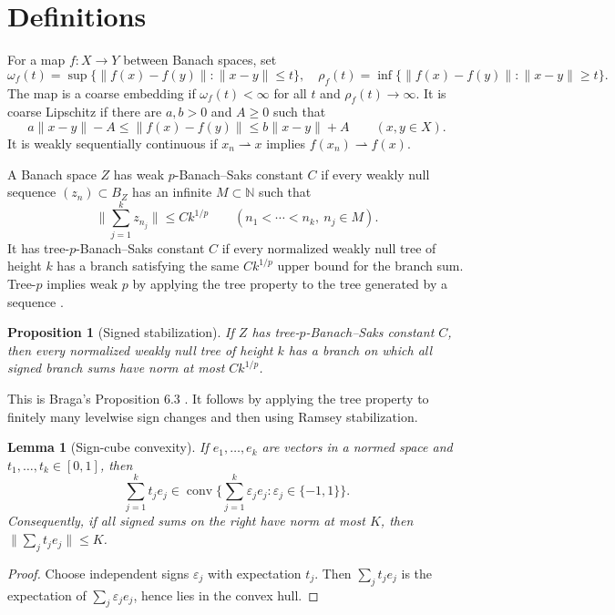 \documentclass[11pt]{article}
\newtheorem{proposition}{Proposition}
\newtheorem{lemma}{Lemma}
\newcommand{\N}{\mathbb N}
\newcommand{\eps}{\varepsilon}
\newcommand{\conv}{\operatorname{conv}}
\newcommand{\norm}[1]{\lVert #1\rVert}
\begin{document}
\section*{Definitions}

For a map \(f:X\to Y\) between Banach spaces, set
\[
 \omega_f(t)=\sup\{\norm{f(x)-f(y)}:\norm{x-y}\le t\},
 \quad
 \rho_f(t)=\inf\{\norm{f(x)-f(y)}:\norm{x-y}\ge t\}.
\]
The map is a coarse embedding if \(\omega_f(t)<\infty\) for all \(t\) and
\(\rho_f(t)\to\infty\).  It is coarse Lipschitz if there are \(a,b>0\) and
\(A\ge0\) such that
\begin{equation}\label{eq:affine-control}
 a\norm{x-y}-A\le\norm{f(x)-f(y)}\le b\norm{x-y}+A
 \qquad(x,y\in X).
\end{equation}
It is weakly sequentially continuous if \(x_n\rightharpoonup x\) implies
\(f(x_n)\rightharpoonup f(x)\).

A Banach space \(Z\) has weak \(p\)-Banach--Saks constant \(C\) if every
weakly null sequence \((z_n)\subset B_Z\) has an infinite \(M\subset\N\) such
that
\[
 \norm{\sum_{j=1}^k z_{n_j}}\le Ck^{1/p}
 \qquad(n_1<\cdots<n_k,\ n_j\in M).
\]
It has tree-\(p\)-Banach--Saks constant \(C\) if every normalized weakly null
tree of height \(k\) has a branch satisfying the same \(Ck^{1/p}\) upper
bound for the branch sum.  Tree-\(p\) implies weak \(p\) by applying the tree
property to the tree generated by a sequence \cite[Remark 6.4]{BragaJIMJ}.

\begin{proposition}[Signed stabilization]\label{prop:signed-tree}
If \(Z\) has tree-\(p\)-Banach--Saks constant \(C\), then every normalized
weakly null tree of height \(k\) has a branch on which all signed branch sums
have norm at most \(Ck^{1/p}\).
\end{proposition}

This is Braga's Proposition 6.3 \cite{BragaJIMJ}.  It follows by applying the
tree property to finitely many levelwise sign changes and then using Ramsey
stabilization.

\begin{lemma}[Sign-cube convexity]\label{lem:sign-cube}
If \(e_1,\ldots,e_k\) are vectors in a normed space and
\(t_1,\ldots,t_k\in[0,1]\), then
\[
 \sum_{j=1}^k t_j e_j\in
 \conv\{\sum_{j=1}^k\eps_j e_j:\eps_j\in\{-1,1\}\}.
\]
Consequently, if all signed sums on the right have norm at most \(K\), then
\(\norm{\sum_j t_j e_j}\le K\).
\end{lemma}

\begin{proof}
Choose independent signs \(\eps_j\) with expectation \(t_j\).  Then
\(\sum_j t_j e_j\) is the expectation of \(\sum_j\eps_j e_j\), hence lies in
the convex hull.
\end{proof}
\end{document}
